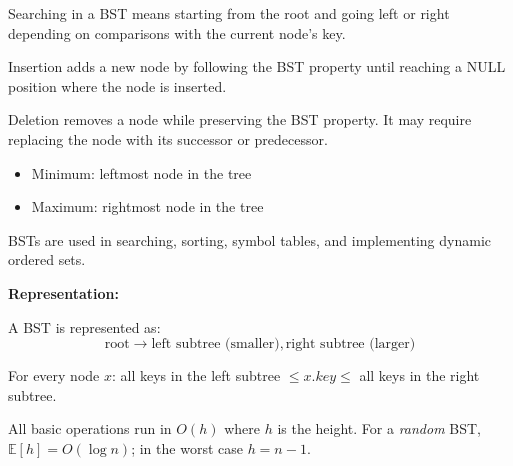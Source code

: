 \documentclass[11pt,a4paper,openany]{book}
\begin{document}
\begin{defnbox}[title=Search]
Searching in a BST means starting from the root and going left or right depending on comparisons with the current node’s key.
\end{defnbox}

\begin{defnbox}[title=Insertion]
Insertion adds a new node by following the BST property until reaching a NULL position where the node is inserted.
\end{defnbox}

\begin{defnbox}[title=Deletion]
Deletion removes a node while preserving the BST property.  
It may require replacing the node with its successor or predecessor.
\end{defnbox}

\begin{defnbox}[title=Minimum and Maximum]
\begin{itemize}
    \item Minimum: leftmost node in the tree
    \item Maximum: rightmost node in the tree
\end{itemize}
\end{defnbox}

\begin{defnbox}[title=Applications]
BSTs are used in searching, sorting, symbol tables, and implementing dynamic ordered sets.
\end{defnbox}

\textbf{Representation:}

A BST is represented as:
\[
\text{root} \rightarrow \text{left subtree (smaller)} , \text{right subtree (larger)}
\]













\begin{defnbox}[title=BST property]
For every node $x$: all keys in the left subtree $\leq x.\mathit{key} \leq$ all keys in
the right subtree.
\end{defnbox}





All basic operations run in $O(h)$ where $h$ is the height.
For a \emph{random} BST, $\mathbb{E}[h] = O(\log n)$; in the worst case $h = n-1$.
\end{document}
